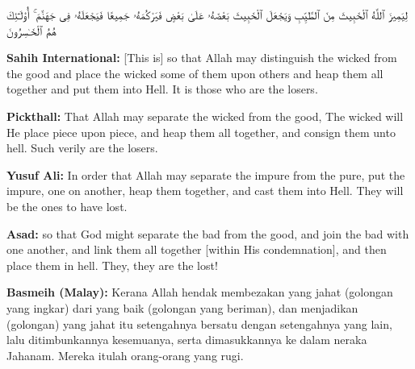 \documentclass[11pt,a4paper,openany]{book}
\let\textAR\textarabic
\newcommand{\quranverse}[1]{{\centering\Large\textAR{#1}\par}}
\begin{document}
\begin{quranbox}[Qur'an 8:37]
\quranverse{لِيَمِيزَ ٱللَّهُ ٱلْخَبِيثَ مِنَ ٱلطَّيِّبِ وَيَجْعَلَ ٱلْخَبِيثَ بَعْضَهُۥ عَلَىٰ بَعْضٍ فَيَرْكُمَهُۥ جَمِيعًا فَيَجْعَلَهُۥ فِى جَهَنَّمَ ۚ أُو۟لَـٰٓئِكَ هُمُ ٱلْخَـٰسِرُونَ}

\vspace{6pt}
\noindent\textbf{Sahih International:} [This is] so that Allah may distinguish the wicked from the good and place the wicked some of them upon others and heap them all together and put them into Hell. It is those who are the losers.

\vspace{4pt}
\noindent\textbf{Pickthall:} That Allah may separate the wicked from the good, The wicked will He place piece upon piece, and heap them all together, and consign them unto hell. Such verily are the losers.

\vspace{4pt}
\noindent\textbf{Yusuf Ali:} In order that Allah may separate the impure from the pure, put the impure, one on another, heap them together, and cast them into Hell. They will be the ones to have lost.

\vspace{4pt}
\noindent\textbf{Asad:} so that God might separate the bad from the good, and join the bad with one another, and link them all together [within His condemnation], and then place them in hell. They, they are the lost!

\vspace{4pt}
\noindent\textbf{Basmeih (Malay):} Kerana Allah hendak membezakan yang jahat (golongan yang ingkar) dari yang baik (golongan yang beriman), dan menjadikan (golongan) yang jahat itu setengahnya bersatu dengan setengahnya yang lain, lalu ditimbunkannya kesemuanya, serta dimasukkannya ke dalam neraka Jahanam. Mereka itulah orang-orang yang rugi.
\end{quranbox}
\end{document}
